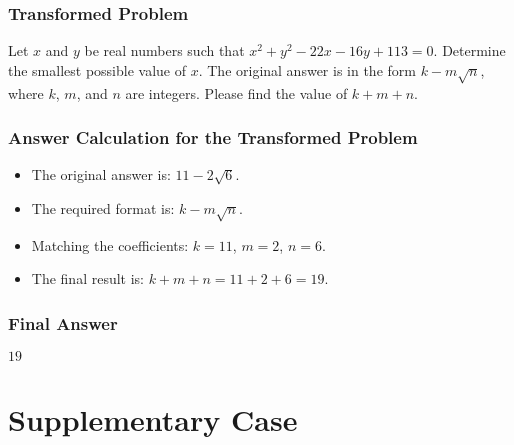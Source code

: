 \begin{tcolorbox}
    \subsubsection*{Transformed Problem}
    \vspace{-5pt}
    Let \( x \) and \( y \) be real numbers such that 
    \(
    x^2 + y^2 - 22x - 16y + 113 = 0.
    \)
    Determine the smallest possible value of \( x \). The original answer is in the form \( k - m\sqrt{n} \), where \( k \), \( m \), and \( n \) are integers. Please find the value of \( k + m + n \).

    \subsubsection*{Answer Calculation for the Transformed Problem}
    \vspace{-5pt}
    \begin{itemize}
        \item The original answer is: \( 11 - 2\sqrt{6} \).
        \item The required format is: \( k - m\sqrt{n} \).
        \item Matching the coefficients: \( k = 11 \), \( m = 2 \), \( n = 6 \).
        \item The final result is: $k + m + n = 11 + 2 + 6 = 19.$
    \end{itemize}
    \vspace{-10pt}
    \subsubsection*{Final Answer}
    \vspace{-5pt}
    $19$

\end{tcolorbox}

\newpage

\section{Supplementary Case}

